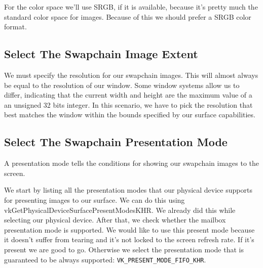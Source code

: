 \begin{minipage}{\linewidth}{\noindent}
    
\end{minipage}

For the color space we'll use SRGB, if it is available, because it's pretty much
the standard color space for images.
Because of this we should prefer a SRGB color format.

\subsection{Select The Swapchain Image Extent}

We must specify the resolution for our swapchain images.
This will almost always be equal to the resolution of our window.
Some window systems allow us to differ, indicating that the current
width and height are the maximum value of a an unsigned 32 bits integer.
In this scenario, we have to pick the resolution that best matches the window
within the bounds specified by our surface capabilities.

\begin{minipage}{\linewidth}{\noindent}
    
\end{minipage}

\subsection{Select The Swapchain Presentation Mode}

A presentation mode tells the conditions for showing our swapchain images to
the screen.

We start by listing all the presentation modes that our physical device supports
for presenting images to our surface.
We can do this using vkGetPhysicalDeviceSurfacePresentModesKHR.
We already did this while selecting our physical device.
After that, we check whether the mailbox presentation mode is supported.
We would like to use this present mode because it doesn't suffer from
tearing and it's not locked to the screen refresh rate.
If it's present we are good to go.
Otherwise we select the presentation mode that is guaranteed to be always supported:
\texttt{VK\_PRESENT\_MODE\_FIFO\_KHR}.

